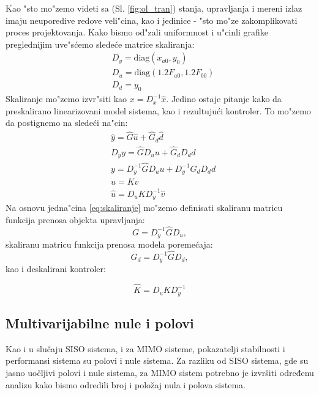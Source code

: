 \documentclass[a4paper,11pt]{article}
\theoremstyle{definition} \newtheorem{deff}{Definicija}[section]
\theoremstyle{definition} \newtheorem{prim}[deff]{Primer}
\theoremstyle{plain} \newtheorem{teor}[deff]{Teorema}
\begin{document}
	Kao "sto mo"zemo videti sa (Sl. \ref{fig:ol_tran}) stanja, upravljanja i mereni izlaz imaju neuporedive redove veli"cina, kao i jedinice - "sto mo"ze zakomplikovati proces projektovanja. Kako bismo od"zali uniformnost i u"cinli grafike preglednijim uve"s\'cemo slede\'ce matrice skaliranja:
	\begin{equation}
		\begin{split}
			&D_y = \text{diag}(x_{a0}, y_0)\\
			&D_u = \text{diag}(1.2F_{a0}, 1.2F_{b0})\\
			&D_d = y_0
		\end{split}
	\end{equation}
	Skaliranje mo"zemo izvr"siti kao $x = D^{-1}_x \hat{x}$. Jedino ostaje pitanje kako da preskalirano linearizovani model sistema, kao i rezultuju\'ci kontroler. To mo"zemo da postignemo na slede\'ci na"cin: 
	\begin{equation}\label{eq:skaliranje}
		\begin{split}
			&\hat{y} = \hat{G}\hat{u} + \hat{G}_d\hat{d}\\
			&D_yy = \hat{G}D_uu + \hat{G}_dD_dd\\
			&y = D^{-1}_y\hat{G}D_uu + D^{-1}_y\hat{G}_dD_dd \\
			&u = Kv\\
			&\hat{u} = D_uKD^{-1}_y\hat{v}
		\end{split}
	\end{equation}
	Na osnovu jedna"cina \eqref{eq:skaliranje} mo"zemo definisati skaliranu matricu funkcija prenosa objekta upravljanja:
	\begin{equation}
		G = D^{-1}_y\hat{G}D_u, 
	\end{equation} skaliranu matricu funkcija prenosa modela poreme\'caja: 
	\begin{equation}
		G_d = D^{-1}_y\hat{G}D_d , 
	\end{equation} kao i deskalirani kontroler: 
	
	\begin{equation}
		\hat{K} = D_uKD^{-1}_y
	\end{equation}
	
	
	\newpage
	\subsection{Multivarijabilne nule i polovi}
	
	Kao i u slučaju SISO sistema, i za MIMO sisteme, pokazatelji stabilnosti i performansi sistema su polovi i nule sistema. Za razliku od SISO sistema, gde su jasno uočljivi polovi i nule sistema, za MIMO sistem potrebno je izvršiti određenu analizu kako bismo odredili broj i položaj nula i polova sistema. \\
	
\end{document}
